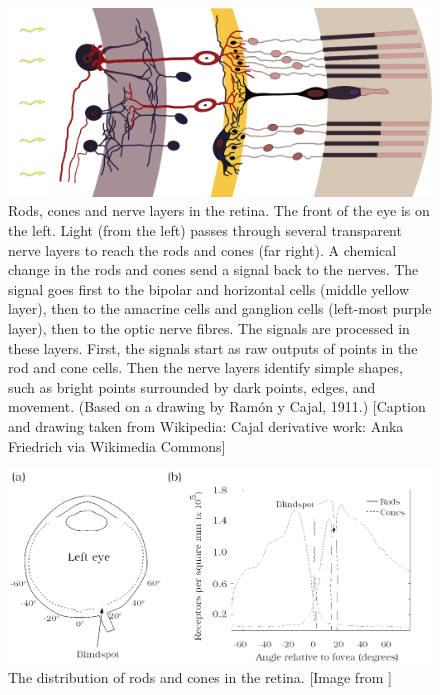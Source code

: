 \documentclass[11pt,a4paper]{scrartcl}
\begin{document}
\begin{figure}
 \begin{center}
\includegraphics[width=12cm]{retina.png}
\end{center}
\caption{Rods, cones and nerve layers in the retina. The front of the
  eye is on the left. Light (from the left) passes through several
  transparent nerve layers to reach the rods and cones (far right). A
  chemical change in the rods and cones send a signal back to the
  nerves. The signal goes first to the bipolar and horizontal cells
  (middle yellow layer), then to the amacrine cells and ganglion cells
  (left-most purple layer), then to the optic nerve fibres. The signals are
  processed in these layers. First, the signals start as raw outputs
  of points in the rod and cone cells. Then the nerve layers identify
  simple shapes, such as bright points surrounded by dark points,
  edges, and movement. (Based on a drawing by Ramón y Cajal, 1911.)
  [Caption and drawing taken from Wikipedia: Cajal derivative work:
    Anka Friedrich via Wikimedia Commons]\label{fig:retina}}
\end{figure}

\begin{figure}
\begin{center}
\includegraphics[width=12cm]{rod_cone_distribution.png}
\end{center}
\caption{The distribution of rods and cones in the retina. [Image from \cite{Wandell1995a}]\label{fig:distribution}}
\end{figure}
\end{document}
